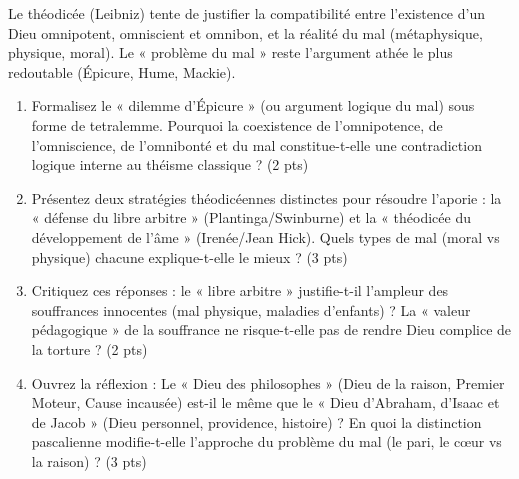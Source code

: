 \documentclass[11pt]{article}
\begin{document}
\begin{exercice}
Le théodicée (Leibniz) tente de justifier la compatibilité entre l'existence d'un Dieu omnipotent, omniscient et omnibon, et la réalité du mal (métaphysique, physique, moral). Le « problème du mal » reste l'argument athée le plus redoutable (Épicure, Hume, Mackie).
\begin{enumerate}
    \item Formalisez le « dilemme d'Épicure » (ou argument logique du mal) sous forme de tetralemme. Pourquoi la coexistence de l'omnipotence, de l'omniscience, de l'omnibonté et du mal constitue-t-elle une contradiction logique interne au théisme classique ? (2 pts)
    \item Présentez deux stratégies théodicéennes distinctes pour résoudre l'aporie : la « défense du libre arbitre » (Plantinga/Swinburne) et la « théodicée du développement de l'âme » (Irenée/Jean Hick). Quels types de mal (moral vs physique) chacune explique-t-elle le mieux ? (3 pts)
    \item Critiquez ces réponses : le « libre arbitre » justifie-t-il l'ampleur des souffrances innocentes (mal physique, maladies d'enfants) ? La « valeur pédagogique » de la souffrance ne risque-t-elle pas de rendre Dieu complice de la torture ? (2 pts)
    \item Ouvrez la réflexion : Le « Dieu des philosophes » (Dieu de la raison, Premier Moteur, Cause incausée) est-il le même que le « Dieu d'Abraham, d'Isaac et de Jacob » (Dieu personnel, providence, histoire) ? En quoi la distinction pascalienne modifie-t-elle l'approche du problème du mal (le pari, le cœur vs la raison) ? (3 pts)
\end{enumerate}
\end{exercice}
\end{document}
